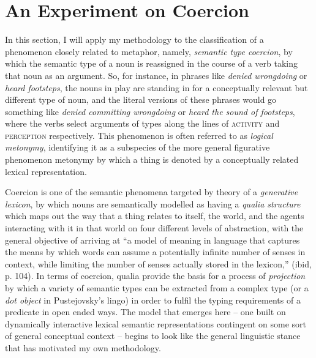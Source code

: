 \section{An Experiment on Coercion}
In this section, I will apply my methodology to the classification of a phenomenon closely related to metaphor, namely, \emph{semantic type coercion}, by which the semantic type of a noun is reassigned in the course of a verb taking that noun as an argument.  So, for instance, in phrases like \emph{denied wrongdoing} or \emph{heard footsteps}, the nouns in play are standing in for a conceptually relevant but different type of noun, and the literal versions of these phrases would go something like \emph{denied committing wrongdoing} or \emph{heard the sound of footsteps}, where the verbs select arguments of types along the lines of \textsc{activity} and \textsc{perception} respectively.  This phenomenon is often referred to as \emph{logical metonymy}, identifying it as a subspecies of the more general figurative phenomenon metonymy by which a thing is denoted by a conceptually related lexical representation.

Coercion is one of the semantic phenomena targeted by  theory of a \emph{generative lexicon}, by which nouns are semantically modelled as having a \emph{qualia structure} which maps out the way that a thing relates to itself, the world, and the agents interacting with it in that world on four different levels of abstraction, with the general objective of arriving at ``a model of meaning in language that captures the means by which words can assume a potentially infinite number of senses in context, while limiting the number of senses actually stored in the lexicon,'' (ibid, p. 104).  In terms of coercion, qualia provide the basis for a process of \emph{projection} by which a variety of semantic types can be extracted from a complex type (or a \emph{dot object} in Pustejovsky's lingo) in order to fulfil the typing requirements of a predicate in open ended ways.  The model that emerges here -- one built on dynamically interactive lexical semantic representations contingent on some sort of general conceptual context -- begins to look like the general linguistic stance that has motivated my own methodology.

